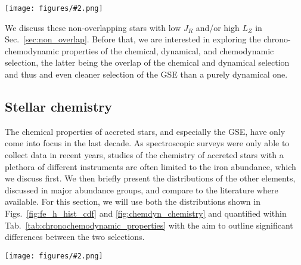 \documentclass[fleqn,usenatbib]{mnras}
\newcommand{\codeicon}{{\faCloudDownload}}
\newcommand{\codelink}[1]{\href{https://github.com/svenbuder/buder_galah_accreted_chemistry/tree/main/figures/#1.ipynb}{\codeicon}\,\,}
\newcommand{\oscaption}[2]{\caption{#2 \codelink{#1}}}
\newcommand{\figuretextwidth}[4]{\begin{figure*} \centering \texttt{[image: figures/\#2.png]}\oscaption{#3}{#4}\label{fig:#2} \end{figure*}}
\begin{document}
\figuretextwidth{17cm}{fe_h_hist_cdf}{chronochemodynamic_comparison}{
\textbf{Relative (top panels) and cumulative (bottom panels) distribution of iron abundances [Fe/H] for our samples of accreted stars.} \textbf{Left panels a and c} show chemically selected accreted stars and compare with the results by \citet{Das2020}.
\textbf{Right panels b and d} show the dynamical selections of the GSE by our work and \citet{Feuillet2020, Feuillet2021} as well as \citet{Naidu2020}.
}

We discuss these non-overlapping stars with low $J_R$ and/or high $L_Z$ in Sec.~\ref{sec:non_overlap}. Before that, we are interested in exploring the chrono-chemodynamic properties of the chemical, dynamical, and chemodynamic selection, the latter being the overlap of the chemical and dynamical selection and thus and even cleaner selection of the GSE than a purely dynamical one.

\subsection{Stellar chemistry}  \label{sec:gse_stellar_chemistry}

The chemical properties of accreted stars, and especially the GSE, have only come into focus in the last decade. As spectroscopic surveys were only able to collect data in recent years, studies of the chemistry of accreted stars with a plethora of different instruments are often limited to the iron abundance, which we discuss first. We then briefly present the distributions of the other elements, discussed in major abundance groups, and compare to the literature where available. For this section, we will use both the distributions shown in Figs.~\ref{fig:fe_h_hist_cdf} and \ref{fig:chemdyn_chemistry} and quantified within Tab.~\ref{tab:chronochemodynamic_properties} with the aim to outline significant differences between the two selections.

\figuretextwidth{17cm}{chemdyn_chemistry}{chronochemodynamic_comparison}{
\textbf{Abundance distributions [X/Fe] (and absolute abundance for Li) as a function of iron abundance [Fe/H] for elements X (noted in each panel).} Shown are the distributions of all GALAH+ DR3 stars (black contours) as well as those of the chemically selected (orange contours) and dynamically selected (red contours). Quantities of each distributions are listed in Tab.~\ref{tab:chronochemodynamic_properties} together with the distribution of the stars within both the chemical and dynamical selection.
}
\end{document}
